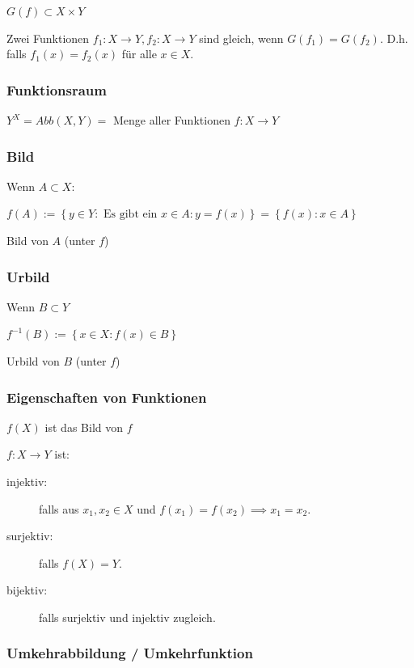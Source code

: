 \documentclass[fleqn]{scrartcl}
\begin{document}
$G(f) \subset X \times Y$

Zwei Funktionen $f_1 : X \to Y, f_2 : X \to Y$ sind gleich, wenn $G(f_1) = G(f_2)$. D.h. falls $f_1(x)=f_2(x)$ für alle $x \in X$.

\subsubsection{Funktionsraum}

$Y^X = Abb(X,Y) = $ Menge aller Funktionen $f : X \to Y$

\subsubsection{Bild}

Wenn $A \subset X$:

$f(A):=\left\{ y \in Y : \text{ Es gibt ein } x \in A : y=f(x) 
\right\} =\left\{ f(x) : x \in A \right\}$

Bild von $A$ (unter $f$)

\subsubsection{Urbild}

Wenn $B \subset Y$ 

$f^{-1}(B):=\left\{ x \in X : f(x) \in B \right\}$

Urbild von $B$ (unter $f$)

\subsubsection{Eigenschaften von Funktionen}

$f(X)$ ist das Bild von $f$

$f : X \to Y$ ist:

\begin{description}
\item[injektiv:] falls aus $x_1,x_2 \in X$ und $f(x_1)=f(x_2) \implies x_1=x_2$. 

\item[surjektiv:] falls $f(X) = Y$.

\item[bijektiv:] falls surjektiv und injektiv zugleich.
\end{description}

\subsubsection{Umkehrabbildung / Umkehrfunktion}
\end{document}
